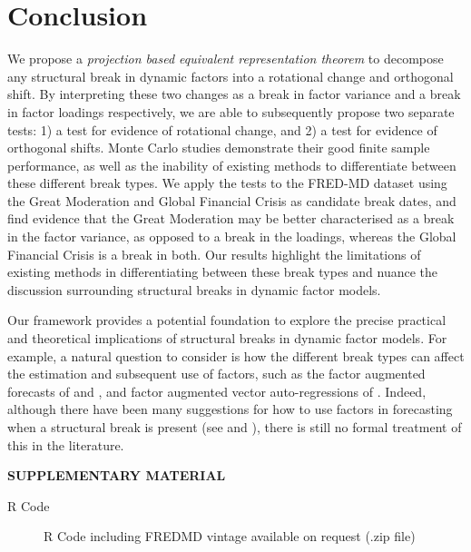 \documentclass[12pt]{article}
\theoremstyle{plain}
\numberwithin{equation}{section}
\begin{document}
\section{Conclusion}
We propose a \emph{projection based equivalent representation theorem} to decompose any structural break in dynamic factors into a rotational change and orthogonal shift. By interpreting these two changes as a break in factor variance and a break in factor loadings respectively, we are able to subsequently propose two separate tests: 1) a test for evidence of rotational change, and 2) a test for evidence of orthogonal shifts. Monte Carlo studies demonstrate their good finite sample performance, as well as the inability of existing methods to differentiate between these different break types. We apply the tests to the FRED-MD dataset using the Great Moderation and Global Financial Crisis as candidate break dates, and find evidence that the Great Moderation may be better characterised as a break in the factor variance, as opposed to a break in the loadings, whereas the Global Financial Crisis is a break in both. Our results highlight the limitations of existing methods in differentiating between these break types and nuance the discussion surrounding structural breaks in dynamic factor models. 

Our framework provides a potential foundation to explore the precise practical and theoretical implications of structural breaks in dynamic factor models. For example, a natural question to consider is how the different break types can affect the estimation and subsequent use of factors, such as the factor augmented forecasts of \textcite{stock_forecasting_2002} and \textcite{bai_confidence_2006}, and factor augmented vector auto-regressions of \textcite{bernanke_measuring_2005}. Indeed, although there have been many suggestions for how to use factors in forecasting when a structural break is present (see \textcite{stock_forecasting_2009} and \textcite{baltagi_estimating_2021}), there is still no formal treatment of this in the literature. 
\bigskip
\begin{center}
{\large\bf SUPPLEMENTARY MATERIAL}
\end{center}

\begin{description}
\item[R Code] R Code including FREDMD vintage available on request (.zip file)
\end{description}
\printbibliography
\end{document}
